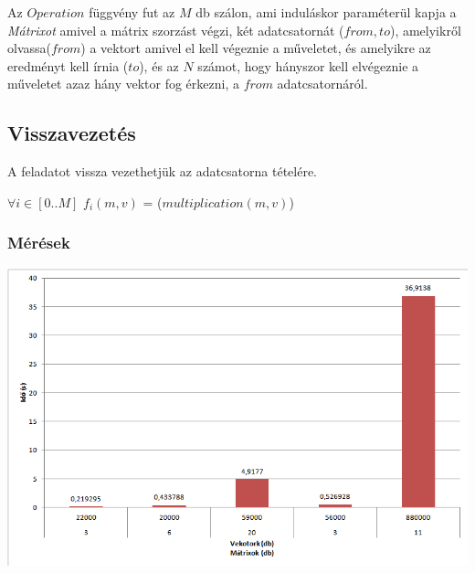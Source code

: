 \documentclass{article}
\newcommand\tab[1][1cm]{\hspace*{#1}}
\begin{document}
Az $Operation$ függvény fut az $M$ db szálon, ami induláskor paraméterül kapja a \textit{Mátrixot} amivel a mátrix szorzást végzi, két adatcsatornát ($from, to$), amelyikről olvassa($from$) a vektort amivel el kell végeznie a műveletet, és amelyikre az eredményt kell írnia ($to$), és az $N$ számot, hogy hányszor kell elvégeznie a műveletet azaz hány vektor fog érkezni, a $from$ adatcsatornáról.
\newpage
\subsection{Visszavezetés}
A feladatot vissza vezethetjük az adatcsatorna tételére.
\begin{center}
\end{center}
\tab $\forall i \in [0..M]$  $f_{i}(m,v)$ = ($multiplication(m,v)$) 
\subsubsection{Mérések}
\begin{center}
\includegraphics[scale=0.42]{meresek}
\end{center}
\end{document}
